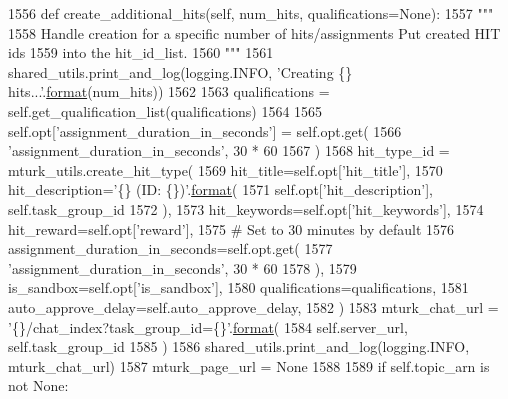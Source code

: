 \begin{DoxyCode}
1556     \textcolor{keyword}{def }create\_additional\_hits(self, num\_hits, qualifications=None):
1557         \textcolor{stringliteral}{"""}
1558 \textcolor{stringliteral}{        Handle creation for a specific number of hits/assignments Put created HIT ids}
1559 \textcolor{stringliteral}{        into the hit\_id\_list.}
1560 \textcolor{stringliteral}{        """}
1561         shared\_utils.print\_and\_log(logging.INFO, \textcolor{stringliteral}{'Creating \{\} hits...'}.\hyperlink{namespaceparlai_1_1chat__service_1_1services_1_1messenger_1_1shared__utils_a32e2e2022b824fbaf80c747160b52a76}{format}(num\_hits))
1562 
1563         qualifications = self.get\_qualification\_list(qualifications)
1564 
1565         self.opt[\textcolor{stringliteral}{'assignment\_duration\_in\_seconds'}] = self.opt.get(
1566             \textcolor{stringliteral}{'assignment\_duration\_in\_seconds'}, 30 * 60
1567         )
1568         hit\_type\_id = mturk\_utils.create\_hit\_type(
1569             hit\_title=self.opt[\textcolor{stringliteral}{'hit\_title'}],
1570             hit\_description=\textcolor{stringliteral}{'\{\} (ID: \{\})'}.\hyperlink{namespaceparlai_1_1chat__service_1_1services_1_1messenger_1_1shared__utils_a32e2e2022b824fbaf80c747160b52a76}{format}(
1571                 self.opt[\textcolor{stringliteral}{'hit\_description'}], self.task\_group\_id
1572             ),
1573             hit\_keywords=self.opt[\textcolor{stringliteral}{'hit\_keywords'}],
1574             hit\_reward=self.opt[\textcolor{stringliteral}{'reward'}],
1575             \textcolor{comment}{# Set to 30 minutes by default}
1576             assignment\_duration\_in\_seconds=self.opt.get(
1577                 \textcolor{stringliteral}{'assignment\_duration\_in\_seconds'}, 30 * 60
1578             ),
1579             is\_sandbox=self.opt[\textcolor{stringliteral}{'is\_sandbox'}],
1580             qualifications=qualifications,
1581             auto\_approve\_delay=self.auto\_approve\_delay,
1582         )
1583         mturk\_chat\_url = \textcolor{stringliteral}{'\{\}/chat\_index?task\_group\_id=\{\}'}.\hyperlink{namespaceparlai_1_1chat__service_1_1services_1_1messenger_1_1shared__utils_a32e2e2022b824fbaf80c747160b52a76}{format}(
1584             self.server\_url, self.task\_group\_id
1585         )
1586         shared\_utils.print\_and\_log(logging.INFO, mturk\_chat\_url)
1587         mturk\_page\_url = \textcolor{keywordtype}{None}
1588 
1589         \textcolor{keywordflow}{if} self.topic\_arn \textcolor{keywordflow}{is} \textcolor{keywordflow}{not} \textcolor{keywordtype}{None}:

\end{DoxyCode}
